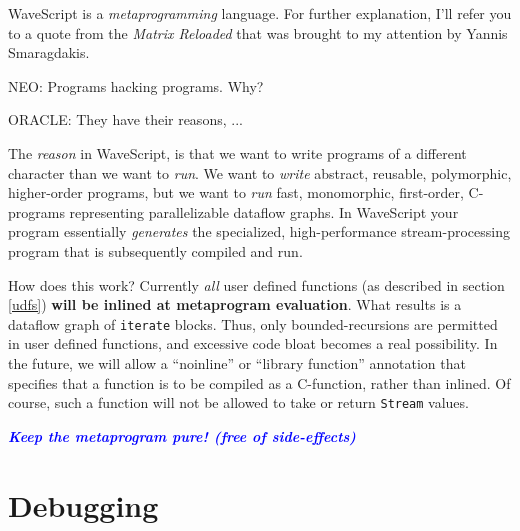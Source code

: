 \documentclass[twocolumn]{report}
\newcommand{\rednote}[1]{{\textcolor{blue}{#1}}}
\begin{document}
WaveScript is a {\em metaprogramming} language.  For further
explanation, I'll refer you to a quote from the {\em Matrix Reloaded}
that was brought to my attention by Yannis Smaragdakis.

\begin{center}
NEO: Programs hacking programs. Why?

ORACLE: They have their reasons, ...
\end{center}

The {\em reason} in WaveScript, is that we want to write programs of a
different character than we want to {\em run}.
We want to {\em write}
abstract, reusable, polymorphic, higher-order programs, but we want to
{\em run} fast, monomorphic, first-order, C-programs representing
parallelizable dataflow graphs.
In WaveScript your program essentially {\em
generates} the specialized, high-performance stream-processing
program that is subsequently compiled and run.  


How does this work?  Currently {\em all} user defined functions (as
described in section \ref{udfs}) {\bf will be inlined at metaprogram
evaluation}.  What results is a dataflow graph of {\tt iterate} blocks.
Thus, only bounded-recursions are permitted in user defined functions,
and excessive code bloat becomes a real possibility.  In the future, we will
allow a ``noinline'' or ``library function'' annotation that specifies
that a function is to be compiled as a C-function, rather than
inlined.  Of course, such a function will not be allowed to take or
return {\tt Stream} values.

\rednote{\em \bf Keep the metaprogram pure! (free of side-effects)}

\section{Debugging}




\end{document}

